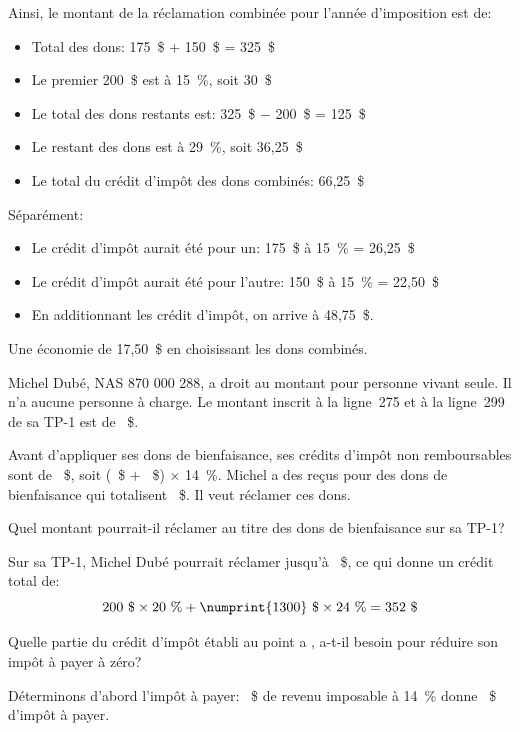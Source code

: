 Ainsi, le montant de la réclamation combinée pour l'année d'imposition est de:
\begin{itemize}
	\item Total des dons: 175~\$ + 150~\$ = 325~\$
	\item Le premier 200~\$ est à 15~\%, soit 30~\$
	\item Le total des dons restants est: 325~\$ $-$ 200~\$ = 125~\$
	\item Le restant des dons est à 29~\%, soit 36,25~\$
	\item Le total du crédit d'impôt des dons combinés: 66,25~\$
\end{itemize}

Séparément:
\begin{itemize}
	\item Le crédit d'impôt aurait été pour un: 175~\$ à 15~\% = 26,25~\$
	\item Le crédit d'impôt aurait été pour l'autre: 150~\$ à 15~\% = 22,50~\$
	\item En additionnant les crédit d'impôt, on arrive à 48,75~\$.
\end{itemize}

Une économie de 17,50~\$ en choisissant les dons combinés.

\begin{question}
	Michel Dubé, NAS 870 000 288, a droit au montant pour personne vivant seule. Il n'a aucune personne à charge. Le montant inscrit à la ligne~275 et à la ligne~299 de sa TP-1 est de ~\$.
	
	Avant d'appliquer ses dons de bienfaisance, ses crédits d'impôt non remboursables sont de ~\$, soit (~\$ $+$ ~\$) $\times$ 14~\%. Michel a des reçus pour des dons de bienfaisance qui totalisent ~\$. Il veut réclamer ces dons.
\end{question}
\setcounter{sousQuestion}{0}
\begin{sousQuestion}
	Quel montant pourrait-il réclamer au titre des dons de bienfaisance sur sa TP-1?
\end{sousQuestion}
Sur sa TP-1, Michel Dubé pourrait réclamer jusqu'à ~\$, ce qui donne un crédit total de:
\[ 200~\$ \times 20~\% + \numprint{1300}~\$ \times 24~\% = 352~\$ \]

\begin{sousQuestion}
	Quelle partie du crédit d'impôt établi au point \og a \fg{}, a-t-il besoin pour réduire son impôt à payer à zéro? 
\end{sousQuestion}
Déterminons d'abord l'impôt à payer: ~\$ de revenu imposable à 14~\% donne ~\$ d'impôt à payer.

